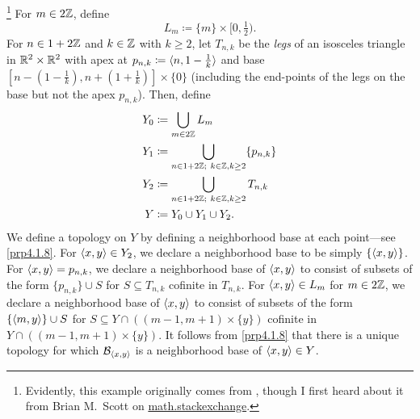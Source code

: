 \begin{exm}\footnote{Evidently, this example originally comes from \cite{Thomas}, though I first heard about it from Brian M.~Scott on \href{http://math.stackexchange.com/questions/386742/making-tychonoff-corkscrew-in-counterexamples-in-topology-rigorous}{math.stackexchange}.}\label{ThomasTentSpace}
For $m\in 2\mathbb{Z}$, define
\begin{equation}
L_m\coloneqq \{ m\} \times [0,\tfrac{1}{2}).
\end{equation}
For $n\in 1+2\mathbb{Z}$ and $k\in \mathbb{Z}$ with $k\geq 2$, let $T_{n,k}$ be the \emph{legs} of an isosceles triangle in $\mathbb{R} ^2\times \mathbb{R} ^2$ with apex at $p_{n,k}\coloneqq \langle n,1-\frac{1}{k}\rangle$ and base $[n-(1-\frac{1}{k}),n+(1+\frac{1}{k})]\times \{ 0\}$ (including the end-points of the legs on the base but not the apex $p_{n,k}$).  Then, define
\begin{equation}
\begin{split}
Y_0 & \coloneqq \bigcup _{m\in 2\mathbb{Z}}L_m \\
Y_1 & \coloneqq \bigcup _{n\in 1+2\mathbb{Z} ;\ k\in \mathbb{Z} ,k\geq 2}\{ p_{n,k}\} \\
Y_2 & \coloneqq \bigcup _{n\in 1+2\mathbb{Z} ;\ k\in \mathbb{Z} ,k\geq 2}T_{n,k} \\
Y & \coloneqq Y_0\cup Y_1\cup Y_2.
\end{split}
\end{equation}
We define a topology on $Y$ by defining a neighborhood base at each point---see \cref{prp4.1.8}.  For $\langle x,y\rangle\in Y_2$, we declare a neighborhood base to be simply $\{ \langle x,y\rangle\}$.  For $\langle x,y\rangle=p_{n,k}$, we declare a neighborhood base of $\langle x,y\rangle$ to consist of subsets of the form $\{ p_{n,k}\} \cup S$ for $S\subseteq T_{n,k}$ cofinite in $T_{n,k}$.  For $\langle x,y\rangle\in L_m$ for $m\in 2\mathbb{Z}$, we declare a neighborhood base of $\langle x,y\rangle$ to consist of subsets of the form $\{ \langle m,y\rangle\}\cup S$ for $S\subseteq Y\cap \left( (m-1,m+1)\times \{ y\}\right)$ cofinite in $Y\cap \left( (m-1,m+1)\times \{ y\}\right)$.  It follows from \cref{prp4.1.8} that there is a unique topology for which $\mathcal{B}_{\langle x,y\rangle}$ is a neighborhood base of $\langle x,y\rangle\in Y$. 


\end{exm}
